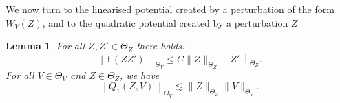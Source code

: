 \documentclass[10pt]{amsart}
\newtheorem{lemm}[theo]{Lemma}\newtheorem{prop}[theo]{Proposition}\newtheorem{coro}[theo]{Corollary}\newtheorem{conj}[theo]{Conjecture}
\theoremstyle{definition}\newtheorem{defi}[theo]{Definition}\newtheorem{rema}[theo]{Remark}\newtheorem{exam}[theo]{Example}\newtheorem{exem}[theo]{Example}\newtheorem{nota}[theo]{Notation}
\newcommand{\E}{\mathbb{E}}
\begin{document}
We now turn to the linearised potential created by a perturbation of the form $W_V(Z)$, and to the quadratic potential created by a perturbation $Z$.


\begin{lemm}\label{lemm6.2}
For all $Z,Z'\in \Theta_Z$ there holds:
\begin{equation} \label{bd:quadembed}
\left\|\E(ZZ')\right\|_{\Theta_V}\leq C \| Z\|_{\Theta_Z}\left\| Z'\right\|_{\Theta_Z}.
\end{equation} For all $V \in \Theta_V$ and $Z \in \Theta_Z$, we have
\begin{equation} \label{bd:Q1}
\left\|Q_1(Z,V)\right\|_{\Theta_V} \lesssim \|Z\|_{\Theta_Z} \|V\|_{\Theta_V}.
\end{equation}
\end{lemm}
\end{document}

